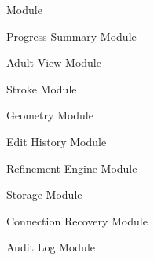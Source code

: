\documentclass[12pt, titlepage]{article}
\newcounter{mnum}
\newcommand{\mthemnum}{M\themnum}
\begin{document}
\begin{description}
  Module
\item [\refstepcounter{mnum} \mthemnum \label{mSummary}:] Progress Summary
  Module
\item [\refstepcounter{mnum} \mthemnum \label{mAdultView}:] Adult View Module
\item [\refstepcounter{mnum} \mthemnum \label{mStroke}:] Stroke Module
\item [\refstepcounter{mnum} \mthemnum \label{mGeometry}:] Geometry Module
\item [\refstepcounter{mnum} \mthemnum \label{mHistory}:] Edit History Module
\item [\refstepcounter{mnum} \mthemnum \label{mRefineEngine}:] Refinement
  Engine Module
\item [\refstepcounter{mnum} \mthemnum \label{mStorage}:] Storage Module
\item [\refstepcounter{mnum} \mthemnum \label{mRecovery}:] Connection Recovery
  Module
\item [\refstepcounter{mnum} \mthemnum \label{mLog}:] Audit Log Module
\end{description}
\end{document}

